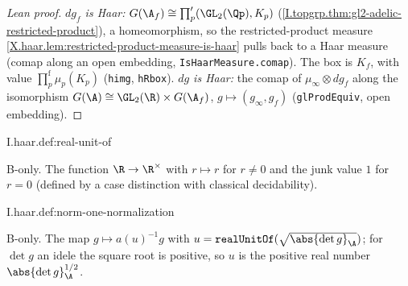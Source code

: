 \begin{proof}[Lean proof]
\emph{$dg_f$ is Haar:} $G(\A_f)\cong\prod'_p(\GL_2(\Qp),K_p)$ (\cref{I.topgrp.thm:gl2-adelic-restricted-product}), a homeomorphism, so the restricted-product measure \cref{X.haar.lem:restricted-product-measure-is-haar} pulls back to a Haar measure (comap along an open embedding, \texttt{IsHaarMeasure.comap}). The box is $K_f$, with value $\prod^{\mathrm f}_p\mu_p(K_p)$ (\texttt{himg}, \texttt{hRbox}). \emph{$dg$ is Haar:} the comap of $\mu_\infty\otimes dg_f$ along the isomorphism $G(\A)\cong\GL_2(\R)\times G(\A_f)$, $g\mapsto(g_\infty,g_f)$ (\texttt{glProdEquiv}, open embedding).
\end{proof}

\begin{definition}
\bonly
{}
\end{definition}
\begin{tfformal}{I.haar.def:real-unit-of}
\begin{tffidelity}
B-only. The function $\R\to\R^\times$ with $r\mapsto r$ for $r\neq0$ and the junk value $1$ for $r=0$ (defined by a case distinction with classical decidability).
\end{tffidelity}
\end{tfformal}

\begin{definition}[normalization to $G(\A)^1$]
\bonly
{}
\end{definition}
\begin{tfformal}{I.haar.def:norm-one-normalization}
\begin{tffidelity}
B-only. The map $g\mapsto a(u)^{-1}g$ with $u=\texttt{realUnitOf}(\sqrt{\abs{\det g}_\A})$; for $\det g$ an idele the square root is positive, so $u$ is the positive real number $\abs{\det g}_\A^{1/2}$.
\end{tffidelity}
\end{tfformal}

